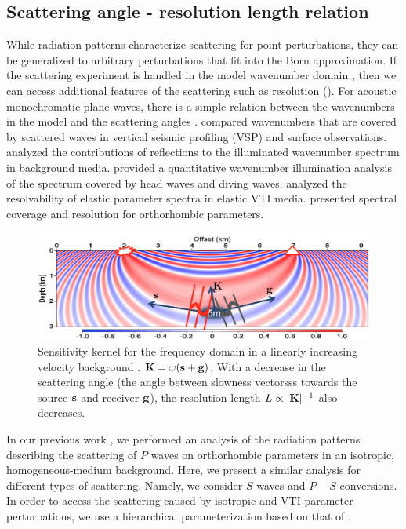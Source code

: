 \subsection{Scattering angle - resolution length relation}

While radiation patterns characterize scattering for point perturbations, they 
can be generalized to arbitrary perturbations that fit into the Born 
approximation. If the scattering experiment is handled in the model wavenumber domain \citep{devaney1984}, then
we can access additional features of the scattering such as resolution ().
%
For acoustic monochromatic plane waves, there is a simple relation between 
the wavenumbers in the model and the scattering angles \citep{ewald1969,devaney1984}. 
\cite{wu:11} compared wavenumbers that are covered by scattered waves in vertical seismic profiling (VSP) 
and surface observations. \cite{mora1989} analyzed the contributions of reflections to the illuminated wavenumber spectrum in background media. \cite{kazei2013gp} 
provided a quantitative wavenumber illumination analysis of the spectrum covered by head waves and diving waves. \cite{podgornova,podgornova2018} analyzed 
the resolvability of elastic parameter spectra in elastic VTI media. 
\cite{kazei2018} presented spectral coverage and resolution for orthorhombic 
parameters. 
%
\begin{figure}
	\centering
	\includegraphics[width=0.9\linewidth]{Fig/Ksg}
	\caption{Sensitivity kernel for the frequency domain in a linearly increasing velocity background \citep{alkhalifah2014scattering,kazei2016}. $\mathbf{K} = \omega(\mathbf{s}+\mathbf{g})$. With a decrease in the scattering angle (the angle between slowness vectorsss towards the source $\mathbf{s}$ and receiver $\mathbf{g}$), the resolution length $L \propto |\mathbf{K}|^{-1}$ also decreases.}
	\label{fig:ksg}
\end{figure}

In our previous work \citep{kazei2018}, we performed an analysis of the 
radiation patterns describing the scattering of $P$ waves on orthorhombic 
parameters in an isotropic, homogeneous-medium background. Here, we present a similar 
analysis for different types of scattering. Namely, we consider $S$ waves and 
$P-S$ conversions. In order to access the scattering caused by isotropic and VTI 
parameter perturbations, we use a hierarchical parameterization based on that of 
\cite{juwon2016, kazei2018}.